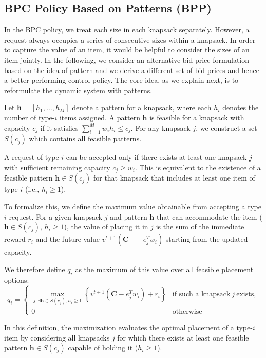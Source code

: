 \subsection{BPC Policy Based on Patterns (BPP)}
In the BPC policy, we treat each size in each knapsack separately. However, a request always occupies
a series of consecutive sizes within a knapsack. In order to capture the value of an item, it would be helpful to consider the sizes of an item jointly. In the following, we consider an alternative bid-price formulation based on the idea of pattern and we derive a different set of bid-prices and hence a better-performing control policy. The core idea, as we explain next, is to reformulate the
dynamic system with patterns.


Let $\bm{h} = [h_{1}, \ldots, h_{M}]$ denote a pattern for a knapsack, where each $h_i$ denotes the number of type-$i$ items assigned. A pattern $\bm{h}$ is feasible for a knapsack with capacity $c_{j}$ if it satisfies $\sum_{i=1}^{M} w_{i} h_{i} \leq c_{j}$. For any knapsack $j$, we
construct a set $S(c_{j})$ which contains all feasible patterns.


A request of type $i$ can be accepted only if there exists at least one knapsack $j$ with sufficient remaining capacity $c_{j} \geq w_{i}$. This is equivalent to the existence of a feasible pattern $\bm{h} \in S(c_{j})$ for that knapsack that includes at least one item of type $i$ (i.e., $h_{i} \geq 1$). 

To formalize this, we define the maximum value obtainable from accepting a type $i$ request. For a given knapsack $j$ and pattern $\bm{h}$ that can accommodate the item ($\bm{h} \in S(c_{j})$, $h_{i} \geq 1$), the value of placing it in $j$ is the sum of the immediate reward $r_{i}$ and the future value $v^{t+1}(\bm{C}- -e_j^T w_i)$ starting from the updated capacity.

We therefore define $q_{i}$ as the maximum of this value over all feasible placement options:
\begin{equation*}
    q_i= \begin{cases}\max _{j: \exists \bm{h} \in S\left(c_j\right), h_i \geq 1}\left\{v^{t+1}\left(\bm{C}-e_j^T w_i\right) + r_i\right\} & \text {if such a knapsack} ~j~ \text {exists}, \\ 0 & \text {otherwise}\end{cases}
\end{equation*}

In this definition, the maximization evaluates the optimal placement of a type-$i$ item by considering all knapsacks $j$ for which there exists at least one feasible pattern $\bm{h} \in S(c_{j})$ capable of holding it ($h_{i} \geq 1$).

